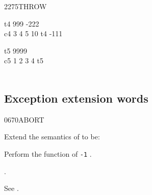 \begin{worddef}{2275}{THROW}
\begin{testing}
		\word{:} t4       999  -222  \word{;} \\
		\word{:} c4 3 4 5 10 \word{[']} t4  -111 \word{;} \\
		 \tab[3]  

		\word{:} t5   9999  \word{;} \\
		\word{:} c5 1 2 3 4 \word{[']} t5  \tab[4.5]   \\
		\tab {}      \word{;} \tab {}  \\
	\end{testing}
\end{worddef}


\subsection{Exception extension words} %
\extended

\begin{worddef}{0670}{ABORT}
\item Extend the semantics of  to be:


	Perform the function of \texttt{-1} .

\see {}.

	\begin{testing}
		See .
	\end{testing}
\end{worddef}


